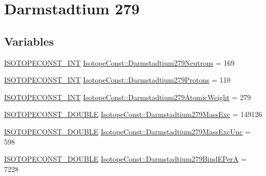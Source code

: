 \hypertarget{group___isotope_const-_darmstadtium-_ds279}{}\section{Darmstadtium 279}
\label{group___isotope_const-_darmstadtium-_ds279}
\subsection*{Variables}
\begin{DoxyCompactItemize}
\item 
\mbox{\hyperlink{group___isotope_const-_macros_ga5f18360b3e99483a35c32d789e62621c}{I\+S\+O\+T\+O\+P\+E\+C\+O\+N\+S\+T\+\_\+\+I\+NT}} \mbox{\hyperlink{group___isotope_const-_darmstadtium-_ds279_ga85c2813c59981263854e6303f7a153e1}{Isotope\+Const\+::\+Darmstadtium279\+Neutrons}} = 169
\item 
\mbox{\hyperlink{group___isotope_const-_macros_ga5f18360b3e99483a35c32d789e62621c}{I\+S\+O\+T\+O\+P\+E\+C\+O\+N\+S\+T\+\_\+\+I\+NT}} \mbox{\hyperlink{group___isotope_const-_darmstadtium-_ds279_gabd16a5dca438047a42619d02efefda24}{Isotope\+Const\+::\+Darmstadtium279\+Protons}} = 110
\item 
\mbox{\hyperlink{group___isotope_const-_macros_ga5f18360b3e99483a35c32d789e62621c}{I\+S\+O\+T\+O\+P\+E\+C\+O\+N\+S\+T\+\_\+\+I\+NT}} \mbox{\hyperlink{group___isotope_const-_darmstadtium-_ds279_ga5212419980e50dc7cb75cdc37116db47}{Isotope\+Const\+::\+Darmstadtium279\+Atomic\+Weight}} = 279
\item 
\mbox{\hyperlink{group___isotope_const-_macros_ga8f45a7272ce02c0b4c65c44636ed719a}{I\+S\+O\+T\+O\+P\+E\+C\+O\+N\+S\+T\+\_\+\+D\+O\+U\+B\+LE}} \mbox{\hyperlink{group___isotope_const-_darmstadtium-_ds279_gacafe64a680f686a2bdce13a12fd33cbd}{Isotope\+Const\+::\+Darmstadtium279\+Mass\+Exc}} = 149126
\item 
\mbox{\hyperlink{group___isotope_const-_macros_ga8f45a7272ce02c0b4c65c44636ed719a}{I\+S\+O\+T\+O\+P\+E\+C\+O\+N\+S\+T\+\_\+\+D\+O\+U\+B\+LE}} \mbox{\hyperlink{group___isotope_const-_darmstadtium-_ds279_gaa5a00e32fdda882d5543251fa06f5526}{Isotope\+Const\+::\+Darmstadtium279\+Mass\+Exc\+Unc}} = 598
\item 
\mbox{\hyperlink{group___isotope_const-_macros_ga8f45a7272ce02c0b4c65c44636ed719a}{I\+S\+O\+T\+O\+P\+E\+C\+O\+N\+S\+T\+\_\+\+D\+O\+U\+B\+LE}} \mbox{\hyperlink{group___isotope_const-_darmstadtium-_ds279_ga7b18ea757f00251590bfc9ff1e5528d5}{Isotope\+Const\+::\+Darmstadtium279\+Bind\+E\+PerA}} = 7228

\end{DoxyCompactItemize}
